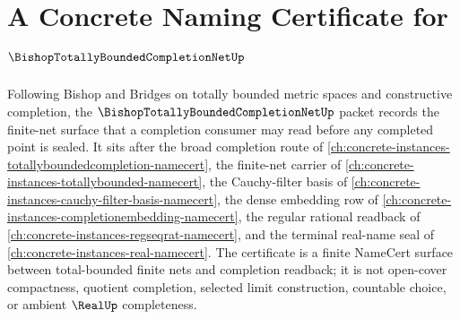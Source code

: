 \chapter{A Concrete Naming Certificate for $\BishopTotallyBoundedCompletionNetUp$}
\label{ch:concrete-instances-bishop-totally-bounded-completion-net-namecert}

Following Bishop and Bridges on totally bounded metric spaces and constructive completion, the $\BishopTotallyBoundedCompletionNetUp$ packet records the finite-net surface that a completion consumer may read before any completed point is sealed. It sits after the broad completion route of \autoref{ch:concrete-instances-totallyboundedcompletion-namecert}, the finite-net carrier of \autoref{ch:concrete-instances-totallybounded-namecert}, the Cauchy-filter basis of \autoref{ch:concrete-instances-cauchy-filter-basis-namecert}, the dense embedding row of \autoref{ch:concrete-instances-completionembedding-namecert}, the regular rational readback of \autoref{ch:concrete-instances-regseqrat-namecert}, and the terminal real-name seal of \autoref{ch:concrete-instances-real-namecert}. The certificate is a finite NameCert surface between total-bounded finite nets and completion readback; it is not open-cover compactness, quotient completion, selected limit construction, countable choice, or ambient $\RealUp$ completeness.

